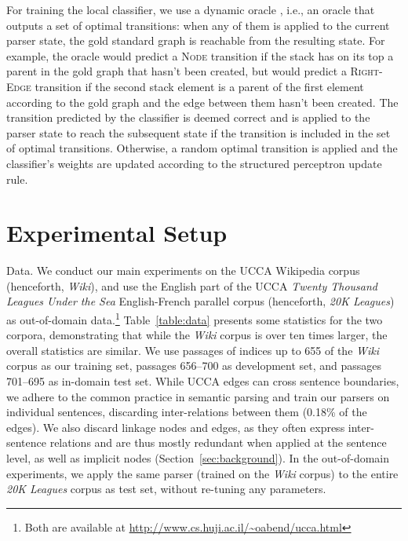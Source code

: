 \documentclass[11pt]{article}
\makeatletter
\newcommand{\secref}[1]{Section~\ref{#1}}
\newcommand{\tabref}[1]{Table~\ref{#1}}
\renewcommand{\paragraph}{
  \@startsection{paragraph}{4}
  {\z@}{.5ex \@plus .5ex \@minus .2ex}{-1em}
  {\normalfont\normalsize\bfseries}
}
\makeatother
\begin{document}
For training the local classifier, we use a dynamic oracle \cite{goldberg2012dynamic},
i.e., an oracle that outputs a set of optimal transitions: when any of them
is applied to the current parser state, the gold
standard graph is reachable from the resulting state.
For example, the oracle would predict a \textsc{Node} transition if the stack 
has on its top a parent in the gold graph that hasn't been created,
but would predict a \textsc{Right-Edge} transition if the second stack
element is a parent of the
first element according to the gold graph and the edge between them hasn't been created.
The transition predicted by the classifier is deemed correct
and is applied to the parser state to reach the subsequent state
if the transition is included in the set of optimal transitions.
Otherwise, a random optimal transition is applied
and the classifier's weights are updated according to the structured perceptron
update rule.




\section{Experimental Setup}\label{sec:exp_setup}

\paragraph{Data.}\label{sec:data}
We conduct our main experiments on the UCCA Wikipedia corpus (henceforth, \textit{Wiki}),
and use the English part of the UCCA \textit{Twenty Thousand Leagues Under the Sea} English-French parallel corpus (henceforth, \textit{20K Leagues}) as
out-of-domain data.\footnote{Both are available at \url{http://www.cs.huji.ac.il/~oabend/ucca.html}}
\tabref{table:data} presents some statistics for the two corpora, demonstrating that while
the \textit{Wiki} corpus is over ten times larger, the overall statistics are
similar.
We use passages of indices up to 655
of the \textit{Wiki} corpus as our training set, passages 656--700 as development set,
and passages 701--695 as in-domain test set.
While UCCA edges can cross sentence boundaries, we adhere to the common
practice in semantic parsing and train our parsers on individual sentences,
discarding inter-relations between them (0.18\% of the edges).
We also discard linkage nodes and edges, as they often express inter-sentence
relations and are thus mostly redundant when applied at the sentence level,
as well as implicit nodes (\secref{sec:background}).
In the out-of-domain experiments, we apply the same parser
(trained on the \textit{Wiki} corpus) to the entire \textit{20K Leagues}
corpus as test set, without re-tuning any parameters.
\end{document}
